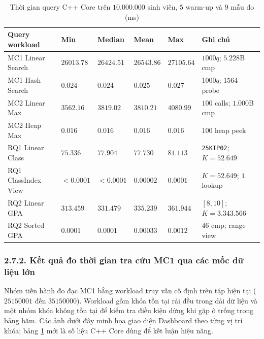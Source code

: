 \documentclass[14pt,a4paper]{extarticle}
\begin{document}
\begin{table}[H]
\centering
\begingroup
\begin{singlespace}
\setlength{\tabcolsep}{3pt}
\renewcommand{\arraystretch}{1.3}
\begin{tabularx}{\textwidth}{|>{\raggedright\arraybackslash}m{2.8cm}|>{\centering\arraybackslash}m{1.9cm}|>{\centering\arraybackslash}m{1.9cm}|>{\centering\arraybackslash}m{1.9cm}|>{\centering\arraybackslash}m{1.9cm}|>{\raggedright\arraybackslash}X|}
\hline
\textbf{Query workload} & \textbf{Min} & \textbf{Median} & \textbf{Mean} & \textbf{Max} & \textbf{Ghi chú} \\ \hline
MC1 Linear Search & $26013.78$ & $26424.51$ & $26543.86$ & $27105.64$ & $1000q$; $5.228$B cmp \\ \hline
MC1 Hash Search & $0.024$ & $0.024$ & $0.025$ & $0.027$ & $1000q$; $1564$ probe \\ \hline
MC2 Linear Max & $3562.16$ & $3819.02$ & $3810.21$ & $4080.99$ & $100$ calls; $1.000$B cmp \\ \hline
MC2 Heap Max & $0.016$ & $0.016$ & $0.016$ & $0.016$ & $100$ heap peek \\ \hline
RQ1 Linear Class & $75.336$ & $77.904$ & $77.730$ & $81.113$ & \texttt{25KTP02}; $K=52.649$ \\ \hline
RQ1 ClassIndex View & $<0.0001$ & $<0.0001$ & $0.00002$ & $0.0001$ & $K=52.649$; $1$ lookup \\ \hline
RQ2 Linear GPA & $313.459$ & $331.479$ & $335.239$ & $361.944$ & $[8,10]$; $K=3.343.566$ \\ \hline
RQ2 Sorted GPA & $0.0001$ & $0.0001$ & $0.00033$ & $0.0012$ & $46$ cmp; range view \\ \hline
\end{tabularx}
\end{singlespace}
\endgroup
\caption{Thời gian query C++ Core trên $10.000.000$ sinh viên, $5$ warm-up và $9$ mẫu đo (ms)}
\label{tab:core_microbenchmark}
\end{table}

\subsubsection*{2.7.2. Kết quả đo thời gian tra cứu MC1 qua các mốc dữ liệu lớn}
{}

Nhóm tiến hành đo đạc MC1 bằng workload truy vấn cố định trên tập hiện tại ($25150001$ đến $35150000$). Workload gồm khóa tồn tại rải đều trong dải dữ liệu và một nhóm khóa không tồn tại để kiểm tra điều kiện dừng khi gặp ô trống trong bảng băm. Các ảnh dưới đây minh họa giao diện Dashboard theo từng vị trí khóa; bảng \ref{tab:core_microbenchmark} mới là số liệu C++ Core dùng để kết luận hiệu năng.
\end{document}
